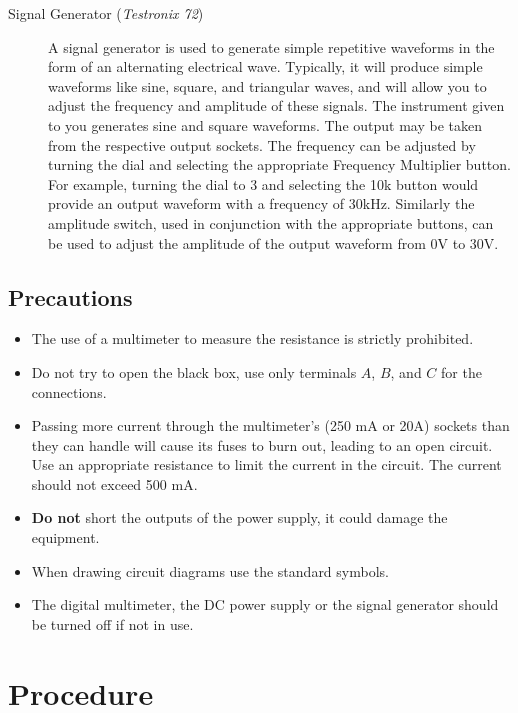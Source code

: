 \begin{description}
\item[Signal Generator (\textit{Testronix 72})]

A signal generator is used to generate simple repetitive waveforms in the form of an alternating electrical wave. Typically, it will produce simple waveforms like sine, square, and triangular waves, and will allow you to adjust the frequency and amplitude of these signals. The instrument given to you generates sine and square waveforms. The output may be taken from the respective output sockets. The frequency can be adjusted by turning the dial and selecting the appropriate Frequency Multiplier button. For example, turning the dial to 3 and selecting the 10k button would provide an output waveform with a frequency of 30kHz. Similarly the amplitude switch, used in conjunction with the appropriate buttons, can be used to adjust the amplitude of the output waveform from 0V to 30V.

\end{description}




\subsection*{Precautions}

\begin{itemize}
\item The use of a multimeter to measure the resistance is strictly prohibited.
\item Do not try to open the black box, use only terminals $A$, $B$, and $C$ for the connections.
\item Passing more current through the multimeter's (250 mA or 20A) sockets than they can handle will cause its fuses to burn out, leading to an open circuit. Use an appropriate resistance to limit the current in the circuit. The current should not exceed 500 mA.
\item \textbf{Do not} short the outputs of the power supply, it could damage the equipment.

\item When drawing circuit diagrams use the standard symbols.
\item The digital multimeter, the DC power supply or the signal generator should be turned off if not in use.

\end{itemize}


\section*{Procedure}


